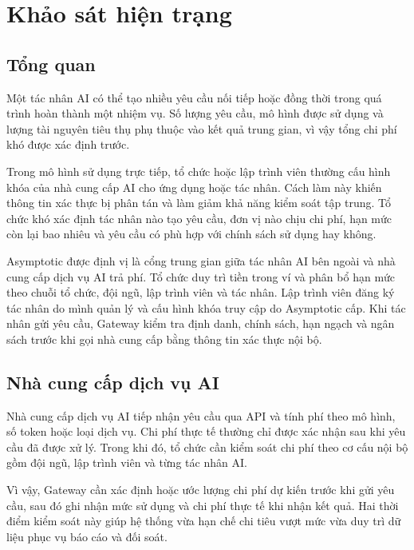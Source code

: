 
\section{Khảo sát hiện trạng}

\subsection*{Tổng quan}

Một tác nhân AI có thể tạo nhiều yêu cầu nối tiếp hoặc đồng thời trong quá trình hoàn thành một nhiệm vụ. Số lượng yêu cầu, mô hình được sử dụng và lượng tài nguyên tiêu thụ phụ thuộc vào kết quả trung gian, vì vậy tổng chi phí khó được xác định trước.

Trong mô hình sử dụng trực tiếp, tổ chức hoặc lập trình viên thường cấu hình khóa của nhà cung cấp AI cho ứng dụng hoặc tác nhân. Cách làm này khiến thông tin xác thực bị phân tán và làm giảm khả năng kiểm soát tập trung. Tổ chức khó xác định tác nhân nào tạo yêu cầu, đơn vị nào chịu chi phí, hạn mức còn lại bao nhiêu và yêu cầu có phù hợp với chính sách sử dụng hay không.

Asymptotic được định vị là cổng trung gian giữa tác nhân AI bên ngoài và nhà cung cấp dịch vụ AI trả phí. Tổ chức duy trì tiền trong ví và phân bổ hạn mức theo chuỗi tổ chức, đội ngũ, lập trình viên và tác nhân. Lập trình viên đăng ký tác nhân do mình quản lý và cấu hình khóa truy cập do Asymptotic cấp. Khi tác nhân gửi yêu cầu, Gateway kiểm tra định danh, chính sách, hạn ngạch và ngân sách trước khi gọi nhà cung cấp bằng thông tin xác thực nội bộ.


\subsection*{Nhà cung cấp dịch vụ AI}

Nhà cung cấp dịch vụ AI tiếp nhận yêu cầu qua API và tính phí theo mô hình, số token hoặc loại dịch vụ. Chi phí thực tế thường chỉ được xác nhận sau khi yêu cầu đã được xử lý. Trong khi đó, tổ chức cần kiểm soát chi phí theo cơ cấu nội bộ gồm đội ngũ, lập trình viên và từng tác nhân AI.

Vì vậy, Gateway cần xác định hoặc ước lượng chi phí dự kiến trước khi gửi yêu cầu, sau đó ghi nhận mức sử dụng và chi phí thực tế khi nhận kết quả. Hai thời điểm kiểm soát này giúp hệ thống vừa hạn chế chi tiêu vượt mức vừa duy trì dữ liệu phục vụ báo cáo và đối soát.

